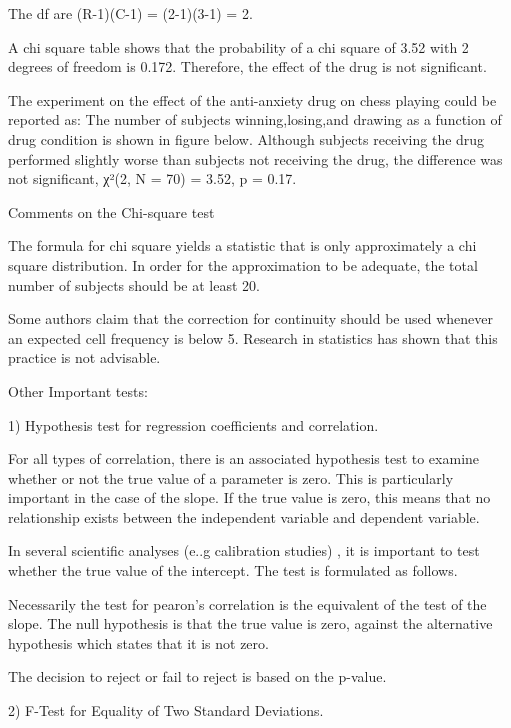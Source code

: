 \begin{frame}
 
 
The df are (R-1)(C-1) = (2-1)(3-1) = 2.

 
A chi square table shows that the probability of a chi square of 3.52 with 2 degrees of freedom is 0.172. Therefore, the effect of the drug is not significant. 
 
 The experiment on the effect of the anti-anxiety drug on chess playing could be reported as:
The number of subjects winning,losing,and drawing as a function of drug condition is shown in figure below. Although subjects receiving the drug performed slightly worse than subjects not receiving the drug, the difference was not significant, χ²(2, N = 70) = 3.52, p = 0.17. 
 
 

Comments on the Chi-square test 
 
The formula for chi square yields a statistic that is only approximately a chi square distribution. In order for the approximation to be adequate, the total number of subjects should be at least 20.
 
Some authors claim that the correction for continuity should be used whenever an expected cell frequency is below 5. Research in statistics has shown that this practice is not advisable.
 
 
Other Important tests: 
 
1) Hypothesis test for regression coefficients and correlation.
 
For all types of correlation, there is an associated hypothesis test to examine whether or not the true value of a parameter is zero. This is particularly important in the case of the slope. If the true value is zero, this means that no relationship exists between the independent variable and dependent variable.
 
    
 
In several scientific analyses (e..g calibration studies) , it is important to test whether the true value of the intercept. The test is formulated as follows. 
 
    
 
Necessarily the test for pearon's correlation is the equivalent of the test of the slope. The null hypothesis is that the true value is zero, against the alternative hypothesis which states that it is not zero.
 
    
 
The decision to reject or fail to reject is based on the p-value. 
 
 
2)  F-Test for Equality of Two Standard Deviations.
 

\end{frame}
